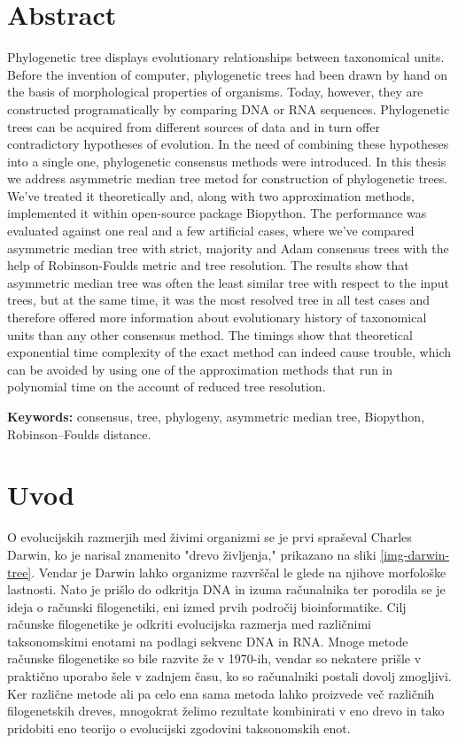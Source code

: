 \documentclass[a4paper, 12pt]{book}
\newcommand{\tkeywordsEn}{consensus, tree, phylogeny, asymmetric median tree, Biopython, Robinson–Foulds distance}
\newcommand{\clearemptydoublepage}{\newpage{\pagestyle{empty}\cleardoublepage}}
\begin{document}
\chapter*{Abstract}
Phylogenetic tree displays evolutionary relationships between taxonomical units. 
Before the invention of computer, phylogenetic trees had been drawn by hand on 
the basis of morphological properties of organisms. Today, however, they are 
constructed programatically by comparing DNA or RNA sequences. Phylogenetic 
trees can be acquired from different sources of data and in turn offer 
contradictory hypotheses of evolution. In the need of combining these hypotheses 
into a single one, phylogenetic consensus methods were introduced. In this thesis 
we address asymmetric median tree metod for construction of phylogenetic trees. 
We've treated it theoretically and, along with two approximation methods, 
implemented it within open-source package Biopython. The performance was evaluated 
against one real and a few artificial cases, where we've compared asymmetric median 
tree  with strict, majority and Adam consensus trees with the help of Robinson-Foulds 
metric and tree resolution. The results show that asymmetric median tree was often the 
least similar tree with respect to the input trees, but at the same time, it was the 
most resolved tree in all test cases and therefore offered more information about 
evolutionary history of taxonomical units than any other consensus method. The timings 
show that theoretical exponential time complexity of the exact method can indeed cause 
trouble, which can be avoided by using one of the approximation methods that run in
polynomial time on the account of reduced tree resolution.
\bigskip

\noindent\textbf{Keywords:} \tkeywordsEn.
\clearemptydoublepage

\mainmatter
\setcounter{page}{1}
\pagestyle{fancy}

\chapter{Uvod}
O evolucijskih razmerjih med živimi organizmi se je prvi spraševal Charles Darwin,
ko je narisal znamenito "drevo življenja," prikazano na sliki \ref{img-darwin-tree}.
Vendar je Darwin lahko organizme razvrščal le glede na njihove morfološke lastnosti.
Nato je prišlo do odkritja DNA in izuma računalnika ter porodila se je ideja o računski
filogenetiki, eni izmed prvih področij bioinformatike. Cilj računske filogenetike je 
odkriti evolucijska razmerja med različnimi taksonomskimi enotami na podlagi sekvenc DNA in RNA.
Mnoge metode računske filogenetike so bile razvite že v 1970-ih, vendar so
nekatere prišle v praktično uporabo šele v zadnjem času, ko so računalniki postali dovolj zmogljivi.
Ker različne metode ali pa celo ena sama metoda lahko proizvede več 
različnih filogenetskih dreves, mnogokrat želimo rezultate kombinirati v eno drevo in 
tako pridobiti eno teorijo o evolucijski zgodovini taksonomskih enot. 
\end{document}
